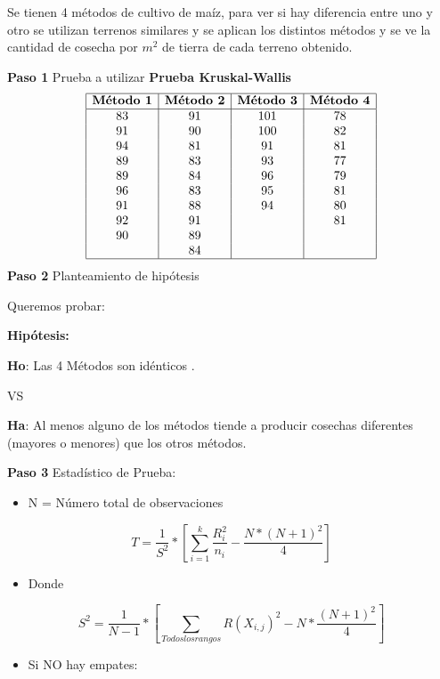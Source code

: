 \documentclass[a4paper,oneside,openany]{book}
\providecommand{\tightlist}{%
  \setlength{\itemsep}{0pt}\setlength{\parskip}{0pt}}
\begin{document}
Se tienen 4 métodos de cultivo de maíz, para ver si hay diferencia entre
uno y otro se utilizan terrenos similares y se aplican los distintos
métodos y se ve la cantidad de cosecha por \(m^2\) de tierra de cada
terreno obtenido.

\textbf{Paso 1} Prueba a utilizar \textbf{Prueba Kruskal-Wallis} \[
\begin{equation*}
\begin{array}{|c| c| c| c|} 
\hline
\textbf{Método 1} & \textbf{Método 2} & \textbf{Método 3} & \textbf{Método 4}\\
\hline
83&91&101&78\\
91&90&100&82\\
94&81&91&81\\
89&83&93&77\\
89&84&96&79\\
96&83&95&81\\
91&88&94&80\\
92&91&  &81\\
90&89&  &\\
  &84&  &\\
  \hline
\end{array}
\end{equation*}
\] \textbf{Paso 2} Planteamiento de hipótesis

Queremos probar:

\textbf{Hipótesis:}

\textbf{Ho}: Las 4 Métodos son idénticos .

VS

\textbf{Ha}: Al menos alguno de los métodos tiende a producir cosechas
diferentes (mayores o menores) que los otros métodos.

\textbf{Paso 3} Estadístico de Prueba:

\begin{itemize}
\tightlist
\item
  N = Número total de observaciones
\end{itemize}

\[T= \frac{1}{S^2}*\left[\sum_{i=1}^{k}\frac{R_{i}^2}{n_{i}} - \frac{N*(N+1)^2}{4}\right]\]

\begin{itemize}
\tightlist
\item
  Donde
\end{itemize}

\[ S^2 = \frac{1}{N-1}*\left[\sum_{Todos los rangos}R(X_{i,j})^2 - N*\frac{(N+1)^2}{4}\right] \]

\begin{itemize}
\tightlist
\item
  Si NO hay empates:
\end{itemize}
\end{document}
